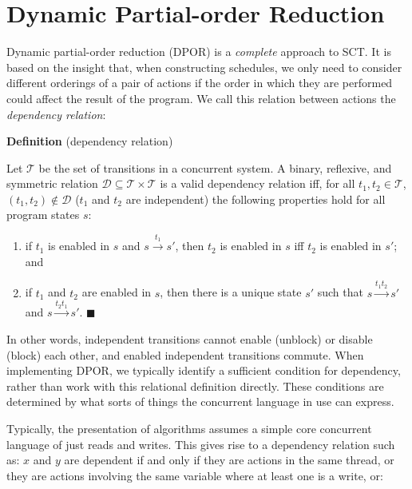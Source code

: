 \section{Dynamic Partial-order Reduction}
\label{sec:sct-dpor}

Dynamic partial-order reduction (DPOR)\cite{flanagan2005,godefroid1996} is a
\emph{complete} approach to SCT\@.  It is based on the insight that, when
constructing schedules, we only need to consider different orderings of a pair
of actions if the order in which they are performed could affect the
result of the program.  We call this relation between actions
the \emph{dependency relation}:

\begin{displayquote}
  \textbf{Definition} (dependency relation\cite{flanagan2005})

  \noindent
  Let $\mathcal T$ be the set of transitions in a concurrent system.  A binary,
  reflexive, and symmetric relation $\mathcal D \subseteq \mathcal
  T \times \mathcal T$ is a valid dependency relation iff, for all $t_{1},
  t_{2} \in \mathcal T$, $(t_{1}, t_{2}) \notin \mathcal D$ ($t_{1}$ and $t_{2}$
  are independent) the following properties hold for all program states $s$:

  \begin{enumerate}
  \item if $t_{1}$ is enabled in $s$ and $s \xrightarrow{t_{1}} s'$, then
    $t_{2}$ is enabled in $s$ iff $t_{2}$ is enabled in $s'$; and

  \item if $t_{1}$ and $t_{2}$ are enabled in $s$, then there is a unique state
    $s'$ such that $s \xrightarrow{t_{1}t_{2}} s'$ and
    $s \xrightarrow{t_{2}t_{1}} s'$.
    \hfill$\blacksquare$
  \end{enumerate}
\end{displayquote}

In other words, independent transitions cannot enable (unblock) or
disable (block) each other, and enabled independent transitions
commute.  When implementing DPOR, we typically identify a sufficient
condition for dependency, rather than work with this relational
definition directly.  These conditions are determined by what sorts of
things the concurrent language in use can express.

Typically, the presentation of algorithms assumes a simple core
concurrent language of just reads and writes.  This gives rise to a
dependency relation such as: $x$ and $y$ are dependent if and only if
they are actions in the same thread, or they are actions involving the
same variable where at least one is a write, or:

